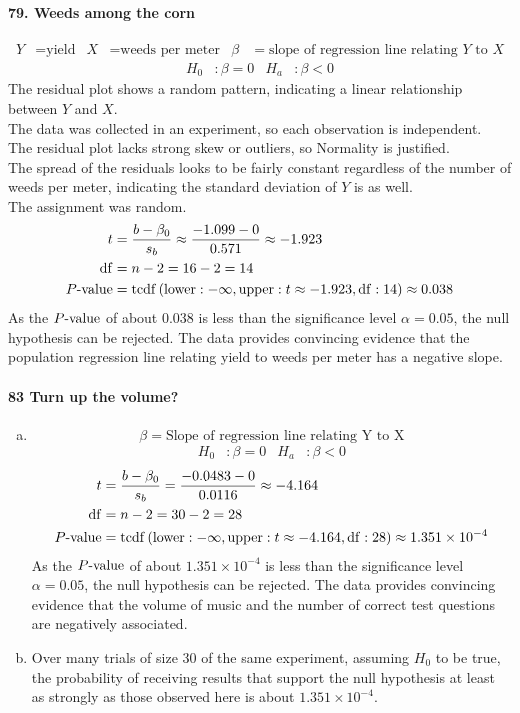 \documentclass[../Homework]{subfiles}
\begin{document}
		\paragraph{79. Weeds among the corn}
			\begin{align*}
				Y &= \text{yield} & X &= \text{weeds per meter} & \beta &= \text{slope of regression line relating $Y$ to $X$}
			\end{align*}
			\begin{align*}
				H_0&: \beta = 0 & H_a&: \beta < 0
			\end{align*}
			The residual plot shows a random pattern, indicating a linear relationship between $Y$ and $X$. \\
			The data was collected in an experiment, so each observation is independent. \\
			The residual plot lacks strong skew or outliers, so Normality is justified. \\
			The spread of the residuals looks to be fairly constant regardless of the number of weeds per meter, indicating the standard deviation of $Y$ is as well. \\
			The assignment was random.
			\begin{align*}
				t &= \frac{b - \beta_0}{s_b} \approx \frac{-1.099 - 0}{0.571} \approx -1.923 \\
				\operatorname{df} &= n - 2 = 16 - 2 = 14 \\
				P\text{-value} &= \operatorname{tcdf}\left(\operatorname{lower}: -\infty, \operatorname{upper}: t \approx -1.923, \operatorname{df}: 14\right) \approx 0.038
			\end{align*}
			As the $P\text{-value}$ of about 0.038 is less than the significance level $\alpha = 0.05$, the null hypothesis can be rejected. The data provides convincing evidence that the population regression line relating yield to weeds per meter has a negative slope.
		\paragraph{83 Turn up the volume?}
			\begin{enumerate}[a.]
				\item
					\[\beta = \text{Slope of regression line relating Y to X}\]
					\begin{align*}
						H_0&: \beta = 0 & H_a&: \beta < 0
					\end{align*}
					\begin{align*}
						t &= \frac{b - \beta_0}{s_b} = \frac{-0.0483 - 0}{0.0116} \approx -4.164 \\
						\operatorname{df} &= n - 2 = 30 - 2 = 28 \\
						P\text{-value} &= \operatorname{tcdf}\left(\operatorname{lower}: -\infty, \operatorname{upper}: t \approx -4.164, \operatorname{df}: 28\right) \approx 1.351 \times 10^{-4}
					\end{align*}
					As the $P\text{-value}$ of about $1.351 \times 10^{-4}$ is less than the significance level $\alpha = 0.05$, the null hypothesis can be rejected. The data provides convincing evidence that the volume of music and the number of correct test questions are negatively associated.
				\item
					Over many trials of size 30 of the same experiment, assuming $H_0$ to be true, the probability of receiving results that support the null hypothesis at least as strongly as those observed here is about $1.351 \times 10^{-4}$.
			\end{enumerate}
\end{document}
